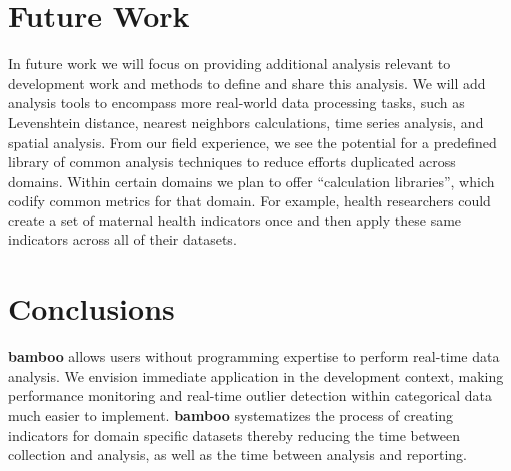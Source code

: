 \documentclass{sig-alternate}
\begin{document}
\section{Future Work}
In future work we will focus on providing additional analysis relevant to
development work and methods to define and share this analysis.
We will add analysis tools to encompass more
real-world data processing tasks, such as Levenshtein distance, nearest
neighbors calculations, time series analysis, and spatial analysis.
From our field experience, we see the potential for a predefined library of common analysis techniques to reduce
efforts duplicated across domains.
Within certain domains we plan to offer ``calculation libraries'',
which codify common metrics for that domain.  For example, health researchers could
create a set of maternal health indicators once and then apply these same
indicators across all of their datasets.

\section{Conclusions}
\textbf{bamboo} allows users without programming expertise to perform real-time
data analysis.
We envision immediate application in the development context, making performance
monitoring \cite{berg} and real-time outlier detection within categorical data \cite{dimagi} much easier to implement. 
\textbf{bamboo} systematizes the process of creating indicators for domain specific datasets thereby reducing the time between collection and analysis, as well as the time between analysis and reporting.


%

\small{
}
%
%

\balancecolumns
\end{document}
